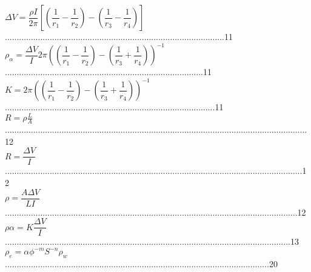 $\Delta V=\dfrac{\rho I}{2 \pi}[(\dfrac{1}{r_{1}}-\dfrac{1}{r_{2}})-(\dfrac{1}{r_{3}}-\dfrac{1}{r_{4}})]$.............................................................................................11\\
$\rho_{\alpha}=\dfrac{\Delta V}{I}2\pi((\dfrac{1}{r_{1}}-\dfrac{1}{r_{2}})-(\dfrac{1}{r_{3}}+\dfrac{1}{r_{4}}))^{-1}$....................................................................................11\\
$K = 2\pi((\dfrac{1}{r_{1}}-\dfrac{1}{r_{2}})-(\dfrac{1}{r_{3}}+\dfrac{1}{r_{4}}))^{-1}$.........................................................................................11\\
$R=\rho\frac{L}{A}$................................................................................................................................12\\
$R=\dfrac{\Delta V}{I}$..............................................................................................................................12\\
$\rho=\dfrac{A  \Delta V}{L  I}$............................................................................................................................12\\
$\rho \alpha=K\dfrac{\Delta V}{I}$.........................................................................................................................13\\
$\rho_{e} = \alpha \phi^{-m}S^{-n}\rho_{w}$................................................................................................................20\\





